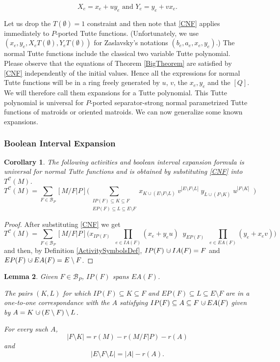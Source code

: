 \documentclass[12pt,leqno]{amsart}
\newtheorem{lem}{Lemma}
\newtheorem{cor}[lem]{Corollary}
\theoremstyle{remark}
\newcommand{\dunion}
{\mbox{\hbox{\hskip6pt$\cdot$\hskip-5.50pt$\cup$\hskip2pt}}}
\newcommand{\Card}[1]{\ensuremath{{\left|#1\right|}}}
\begin{document}
\begin{equation}
\tag{CNF}
\label{CNF}
X_e = x_e + uy_e \text{ and } Y_e = y_e + vx_e.
\end{equation}

Let us drop the $T(\emptyset)=1$ constraint and then
note that \eqref{CNF} applies immediately to $P$-ported Tutte functions.
(Unfortunately, we use 
$(x_e, y_e, X_eT(\emptyset), Y_eT(\emptyset))$ for Zaslavsky's
notations $(b_e, a_e, x_e, y_e)$.)  The normal Tutte functions
include the classical two variable Tutte polynomial.
Please observe that the equations of Theorem \ref{BigTheorem}
are satisfied by \eqref{CNF} independently of the
initial values.  Hence all the expressions for normal Tutte
functions will be in a ring freely generated by
$u$, $v$, the $x_e, y_e$ and the $[Q]$.  We will therefore
call them expansions for a Tutte polynomial.  This
Tutte polynomial is universal for $P$-ported separator-strong
normal parametrized Tutte functions of matroids or oriented matroids.
We can now generalize some known expansions.

\subsubsection{Boolean Interval Expansion}

\begin{cor}
\label{NormalActProp}
The following activities and boolean interval expansion formula
is universal for normal Tutte functions and
is obtained by substituting \eqref{CNF} 
into $T^{\mathcal{C}}(M)$.
\[
T^{\mathcal{C}}(M)=
\sum_{F\in \mathcal{B}_P}[M/F|P]
\Big(
\sum_{\substack{
       IP(F)\subseteq K \subseteq F\\
       EP(F)\subseteq L \subseteq E\setminus F
      }}
 x_{K\cup (E\setminus F\setminus L)}\;
 v^{\Card{E\setminus F\setminus L}}\;
 y_{L\cup (F\setminus K)}\;
 u^{\Card{F\setminus K}}\;\;
\Big)
\]
\end{cor}

\begin{proof} After substituting \eqref{CNF} we get
\[
T^{\mathcal{C}}(M)=
\sum_{F\in \mathcal{B}_P}[M/F|P]
\Big(
x_{IP(F)}\;\;
\prod_{e\in IA(F)}\left(x_e+y_eu\right)\;\;
y_{EP(F)}\;\;
\prod_{e\in EA(F)}\left(y_e+x_ev\right)
\Big)
\]
and then, by Definition \ref{ActivitySymbolsDef}, 
$IP(F)\dunion IA(F) =F$ and 
$EP(F)\dunion EA(F)=E\setminus F$.
 \end{proof}


\begin{lem}
\label{KLAlemma}
Given $F\in\mathcal{B}_P$,
$IP(F)$ spans $EA(F)$.

The pairs $(K,L)$ for which 
       $IP(F)\subseteq K \subseteq F$ and 
       $EP(F)\subseteq L \subseteq E\setminus F$
are in a one-to-one correspondance
with the $A$ satisfying $IP(F)\subseteq A\subseteq F\dunion EA(F)$
given by $A=K\dunion (E\setminus F)\setminus L$.


For every such $A$, 
\[
\Card{F\setminus K}=r(M)-r(M/F|P)-r(A)
\]
and
\[
\Card{E\setminus F\setminus L} = \Card{A}-r(A).
\]
\end{lem}
\end{document}
